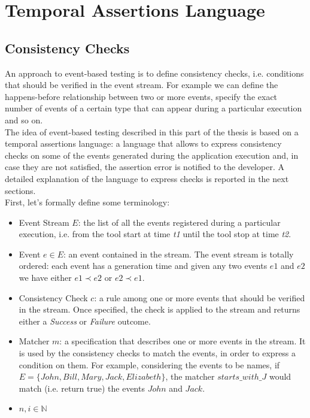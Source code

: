 \documentclass[11pt,a4paper,notitlepage]{article}
\begin{document}
\section{Temporal Assertions Language}

\subsection{Consistency Checks}
An approach to event-based testing is to define consistency checks, i.e. conditions that should be verified in the event stream. For example we can define the happens-before relationship between two or more events, specify the exact number of events of a certain type that can appear during a particular execution and so on.\medskip \\
The idea of event-based testing described in this part of the thesis is based on a temporal assertions language: a language that allows to express consistency checks on some of the events generated during the application execution and, in case they are not satisfied, the assertion error is notified to the developer. A detailed explanation of the language to express checks is reported in the next sections.\bigskip \\
First, let's formally define some terminology:
\begin{itemize}
	\item Event Stream $E$: the list of all the events registered during a particular execution, i.e. from the tool start at time \textit{t1} until the tool stop at time \textit{t2}.
	\item Event $e \in E$: an event contained in the stream. The event stream is totally ordered: each event has a generation time and given any two events $e1$ and $e2$ we have either $e1 \prec e2$ or $e2 \prec e1$.
	\item Consistency Check $c$: a rule among one or more events that should be verified in the stream. Once specified, the check is applied to the stream and returns either a \textit{Success} or \textit{Failure} outcome.
	\item Matcher $m$: a specification that describes one or more events in the stream. It is used by the consistency checks to match the events, in order to express a condition on them. For example, considering the events to be names, if $E= \big\{ John, Bill, Mary, Jack, Elizabeth \big\} $, the matcher $starts\_with\_J$ would match (i.e. return true) the events $John$ and $Jack$.
	\item $n, i \in \mathbb{N}$
\end{itemize}\medskip
\end{document}
